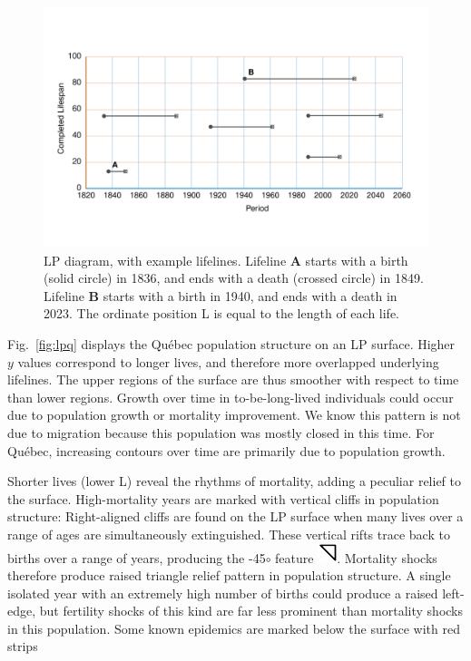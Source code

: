 \documentclass{bmcart}
\begin{document}
\begin{figure}
\centering
\includegraphics[scale=.7]{Figures/LPdiagram.pdf}
\caption{LP diagram, with example lifelines. Lifeline \textbf{A} starts with a birth (solid circle) in 1836, and ends with a death (crossed circle) in 1849. Lifeline \textbf{B} starts with a birth in 1940, and ends with a death in 2023. The ordinate position L is equal to the length of each life.}
\label{fig:lpd}
\end{figure}

Fig.~\ref{fig:lpq} displays the Qu\'{e}bec population structure on an LP surface. Higher $y$ values correspond to longer lives, and therefore more overlapped underlying lifelines. The upper regions of the surface are thus smoother with respect to time than lower regions. Growth over time in to-be-long-lived individuals could occur due to population growth or mortality improvement. We know this pattern is not due to migration because this population was mostly closed in this time. For Qu\'{e}bec, increasing contours over time are primarily due to population growth. 

Shorter lives (lower L) reveal the rhythms of mortality, adding a peculiar relief to the surface. High-mortality years are marked with vertical cliffs in population structure: Right-aligned cliffs are found on the LP surface when many lives over a range of ages are simultaneously extinguished. These vertical rifts trace back to births over a range of years, producing the -45$\circ$ feature \includegraphics{Figures/LP_mort_tri.pdf}. Mortality shocks therefore produce raised triangle relief pattern in population structure. A single isolated year with an extremely high number of births could produce a raised left-edge, but fertility shocks of this kind are far less prominent than mortality shocks in this population. Some known epidemics are marked below the surface with red strips \citep[cf Figure 1.1][]{mazan2011} 
\end{document}

